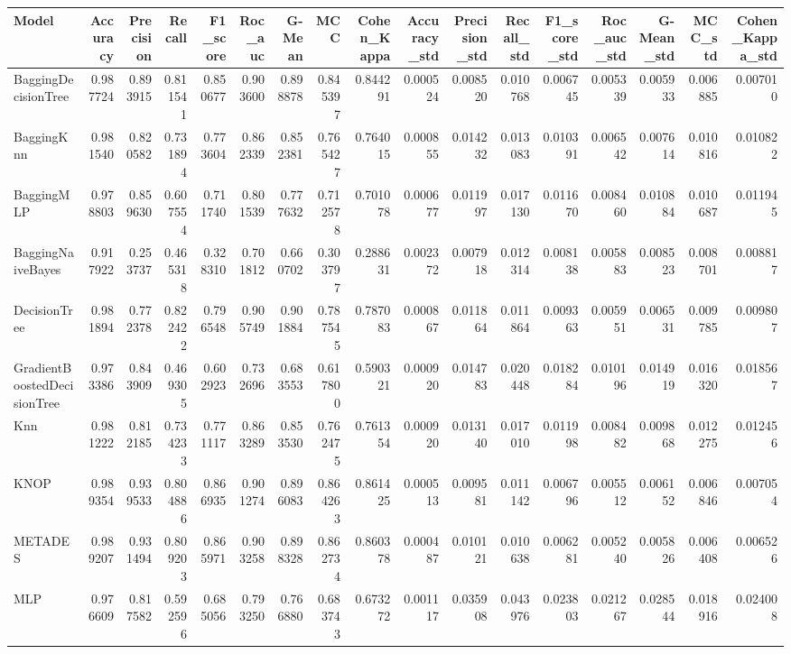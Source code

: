 \begin{tabular}{lrrrrrrrrrrrrrrrr}
\toprule
Model & Accuracy & Precision & Recall & F1_score & Roc_auc & G-Mean & MCC & Cohen_Kappa & Accuracy_std & Precision_std & Recall_std & F1_score_std & Roc_auc_std & G-Mean_std & MCC_std & Cohen_Kappa_std \\
\midrule
BaggingDecisionTree & 0.987724 & 0.893915 & 0.811541 & 0.850677 & 0.903600 & 0.898878 & 0.845397 & 0.844291 & 0.000524 & 0.008520 & 0.010768 & 0.006745 & 0.005339 & 0.005933 & 0.006885 & 0.007010 \\
BaggingKnn & 0.981540 & 0.820582 & 0.731894 & 0.773604 & 0.862339 & 0.852381 & 0.765427 & 0.764015 & 0.000855 & 0.014232 & 0.013083 & 0.010391 & 0.006542 & 0.007614 & 0.010816 & 0.010822 \\
BaggingMLP & 0.978803 & 0.859630 & 0.607554 & 0.711740 & 0.801539 & 0.777632 & 0.712578 & 0.701078 & 0.000677 & 0.011997 & 0.017130 & 0.011670 & 0.008460 & 0.010884 & 0.010687 & 0.011945 \\
BaggingNaiveBayes & 0.917922 & 0.253737 & 0.465318 & 0.328310 & 0.701812 & 0.660702 & 0.303797 & 0.288631 & 0.002372 & 0.007918 & 0.012314 & 0.008138 & 0.005883 & 0.008523 & 0.008701 & 0.008817 \\
DecisionTree & 0.981894 & 0.772378 & 0.822422 & 0.796548 & 0.905749 & 0.901884 & 0.787545 & 0.787083 & 0.000867 & 0.011864 & 0.011864 & 0.009363 & 0.005951 & 0.006531 & 0.009785 & 0.009807 \\
GradientBoostedDecisionTree & 0.973386 & 0.843909 & 0.469305 & 0.602923 & 0.732696 & 0.683553 & 0.617800 & 0.590321 & 0.000920 & 0.014783 & 0.020448 & 0.018284 & 0.010196 & 0.014919 & 0.016320 & 0.018567 \\
Knn & 0.981222 & 0.812185 & 0.734233 & 0.771117 & 0.863289 & 0.853530 & 0.762475 & 0.761354 & 0.000920 & 0.013140 & 0.017010 & 0.011998 & 0.008482 & 0.009868 & 0.012275 & 0.012456 \\
KNOP & 0.989354 & 0.939533 & 0.804886 & 0.866935 & 0.901274 & 0.896083 & 0.864263 & 0.861425 & 0.000513 & 0.009581 & 0.011142 & 0.006796 & 0.005512 & 0.006152 & 0.006846 & 0.007054 \\
METADES & 0.989207 & 0.931494 & 0.809203 & 0.865971 & 0.903258 & 0.898328 & 0.862734 & 0.860378 & 0.000487 & 0.010121 & 0.010638 & 0.006281 & 0.005240 & 0.005826 & 0.006408 & 0.006526 \\
MLP & 0.976609 & 0.817582 & 0.592596 & 0.685056 & 0.793250 & 0.766880 & 0.683743 & 0.673272 & 0.001117 & 0.035908 & 0.043976 & 0.023803 & 0.021267 & 0.028544 & 0.018916 & 0.024008 \\

\end{tabular}
